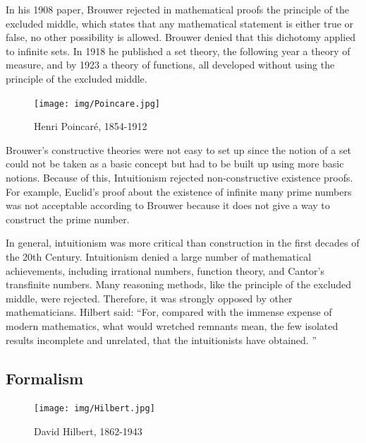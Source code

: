 \documentclass{article}
\begin{document}
In his 1908 paper, Brouwer rejected in mathematical proofs the principle of the excluded middle, which states that any mathematical statement is either true or false, no other possibility is allowed. Brouwer denied that this dichotomy applied to infinite sets. In 1918 he published a set theory, the following year a theory of measure, and by 1923 a theory of functions, all developed without using the principle of the excluded middle.

\begin{figure}
 \centering
 \texttt{[image: img/Poincare.jpg]}
 \captionsetup{labelformat=empty}
 \caption{Henri Poincaré, 1854-1912}
 \label{fig:Poincare}
\end{figure}

Brouwer's constructive theories were not easy to set up since the notion of a set could not be taken as a basic concept but had to be built up using more basic notions. Because of this, Intuitionism rejected non-constructive existence proofs. For example, Euclid's proof about the existence of infinite many prime numbers was not acceptable according to Brouwer because it does not give a way to construct the prime number.

In general, intuitionism was more critical than construction in the first decades of the 20th Century. Intuitionism denied a large number of mathematical achievements, including irrational numbers, function theory, and Cantor's transfinite numbers. Many reasoning methods, like the principle of the excluded middle, were rejected. Therefore, it was strongly opposed by other mathematicians. Hilbert said: ``For, compared with the immense expense of modern mathematics, what would wretched remnants mean, the few isolated results incomplete and unrelated, that the intuitionists have obtained. ''


\subsection{Formalism}

\begin{figure}
 \centering
 \texttt{[image: img/Hilbert.jpg]}
 \captionsetup{labelformat=empty}
 \caption{David Hilbert, 1862-1943}
 \label{fig:Hilbert}
\end{figure}
\end{document}
